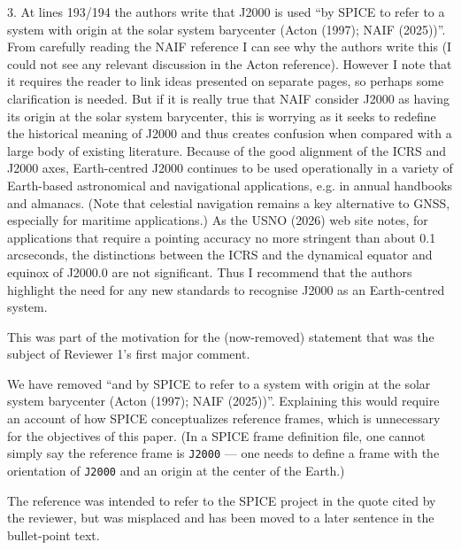 \documentclass[11pt]{article}
\begin{document}
3. At lines 193/194 the authors write that J2000 is used “by SPICE to refer to a system with origin at the solar system barycenter (Acton (1997); NAIF (2025))”. From carefully reading the NAIF reference I can see why the authors write this (I could not see any relevant discussion in the Acton reference). However I note that it requires the reader to link ideas presented on separate pages, so perhaps some clarification is needed. But if it is really true that NAIF consider J2000 as having its origin at the solar system barycenter, this is worrying as it seeks to redefine the historical meaning of J2000 and thus creates confusion when compared with a large body of existing literature. Because of the good alignment of the ICRS and J2000 axes, Earth-centred J2000 continues to be used operationally in a variety of Earth-based astronomical and navigational applications, e.g. in annual handbooks and almanacs. (Note that celestial navigation remains a key alternative to GNSS, especially for maritime applications.) As the USNO (2026) web site notes, for applications that require a pointing accuracy no more stringent than about 0.1 arcseconds, the distinctions between the ICRS and the dynamical equator and equinox of J2000.0 are not significant. Thus I recommend that the authors highlight the need for any new standards to recognise J2000 as an Earth-centred system.
\\
{\color{violet}
\begin{leftbar}
This was part of the motivation for the (now-removed) statement that was the subject of Reviewer 1's first major comment. 

We have removed ``and by SPICE to refer to a system with origin at the solar system barycenter (Acton (1997); NAIF (2025))''. Explaining this would require an account of how SPICE conceptualizes reference frames, which is unnecessary for the objectives of this paper. (In a SPICE frame definition file, one cannot simply say the reference frame is \texttt{J2000} --- one needs to define a frame with the orientation of \texttt{J2000} and an origin at the center of the Earth.)

The \cite{Acton1997} reference was intended to refer to the SPICE project in the quote cited by the reviewer, but was misplaced and has been moved to a later sentence in the bullet-point text.







\end{leftbar}
}
\end{document}
